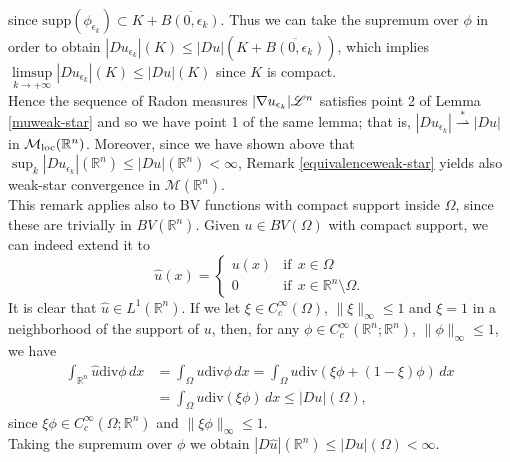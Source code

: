 \begin{remark}
\begin{align*}
\end{align*}
since $\mathrm{supp}(\phi_{\epsilon_{k}}) \subset K + \overline{B(0, \epsilon_{k})}$. Thus we can take the supremum over $\phi$ in order to obtain $|D u_{\epsilon_{k}}|(K) \le |D u|(K + \overline{B(0, \epsilon_{k})})$, which implies $\limsup \limits_{k \to + \infty} |D u_{\epsilon_{k}}|(K) \le |D u|(K)$ since $K$ is compact.
\\
Hence the sequence of Radon measures $|\nabla u_{\epsilon_{k}}| \mathscr{L}^{n}$ satisfies point 2 of Lemma \ref{muweak-star} and so we have point 1 of the same lemma; that is, $|D u_{\epsilon_{k}}| \stackrel {*}{\rightharpoonup} |Du|$ in $\mathcal{M}_{\rm loc}(\mathbb{R}^{n})$. Moreover, since we have shown above that $\sup_{k} |Du_{\epsilon_{k}}|(\mathbb{R}^{n}) \le |Du|(\mathbb{R}^{n}) < \infty$, Remark \ref{equivalenceweak-star} yields also weak-star convergence in $\mathcal{M}(\mathbb{R}^{n})$.
\\

This remark applies also to BV functions with compact support inside $\Omega$, since these are trivially in $BV(\mathbb{R}^{n})$. Given $u \in BV(\Omega)$ with compact support, we can indeed extend it to 
\[ \hat{u}(x) = \begin{cases} u(x) & \mbox{if} \ \ x \in \Omega \\ 0 & \mbox{if} \ \ x \in \mathbb{R}^{n} \setminus \Omega. \end{cases} \]
It is clear that $\hat{u} \in L^{1}(\mathbb{R}^{n})$. If we let $\xi \in C^{\infty}_{c}(\Omega)$, $\|\xi\|_{\infty} \le 1$ and $\xi = 1$ in a neighborhood of the support of $u$, then, for any $\phi \in C^{\infty}_{c}(\mathbb{R}^{n}; \mathbb{R}^{n})$, $\|\phi\|_{\infty} \le 1$, we have
\begin{align*} \int_{\mathbb{R}^{n}} \hat{u} \mathrm{div}\phi \, dx & = \int_{\Omega} u \mathrm{div}\phi \, dx = \int_{\Omega} u \mathrm{div}(\xi \phi + (1 - \xi) \phi) \, dx \\
& = \int_{\Omega} u \mathrm{div}(\xi \phi) \, dx \le |Du|(\Omega), 
\end{align*}
since $\xi \phi \in C^{\infty}_{c}(\Omega; \mathbb{R}^{n})$ and $\|\xi \phi\|_{\infty} \le 1$. 
\\
Taking the supremum over $\phi$ we obtain $|D \hat{u}|(\mathbb{R}^{n}) \le |Du|(\Omega) < \infty$.
\end{remark}


